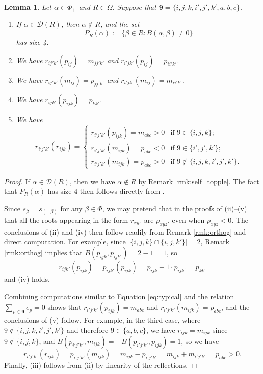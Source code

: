 \documentclass[10pt,a4paper]{amsart}
\newtheorem{lemma}[theorem]{Lemma}
\numberwithin{equation}{section}
\newcommand{\al}{\alpha}
\newcommand{\be}{\beta}
\newcommand{\res}{\mathscr{D}}
\newcommand{\nine}{\mathbf{9}}
\newcommand{\ob}{\Omega}
\newcommand{\pra}{P_R(\al)}
\newcommand{\abs}[1]{\lvert #1 \rvert}
\begin{document}
\begin{lemma}
\label{lem:res_prep}
Let $\al\in \Phi_+$ and $R\in \ob$.
Suppose that $\nine=\{i,j,k,i',j',k',a,b,c\}$.
\begin{enumerate}
\item If $\al\in \res(R)$, then $\al\notin R$, and the set
  \[
    \pra:=\{\beta\in R: B(\al,\beta)\neq 0\}
  \]
  has size 4.  
\item We have $r_{ij'k'}(p_{ij})=m_{jj'k'}$ and $r_{i'jk'}(p_{ij})=p_{ii'k'}$.
\item We have $r_{ij'k'}(m_{ij})=p_{jj'k'}$ and $r_{i'jk'}(m_{ij})=m_{ii'k'}$.
\item We have $r_{ijk'}(p_{ijk})=p_{kk'}$.
\item We have 
  \[
    r_{i'j'k'}(r_{ijk})= 
  \begin{cases} 
    r_{i'j'k'}(p_{ijk})=m_{abc}>0 & \text{if $9\in \{i,j,k\}$};\\
    r_{i'j'k'}(m_{ijk})=p_{abc}<0 & \text{if $9\in \{i',j',k'\}$};\\
    r_{i'j'k'}(m_{ijk})=p_{abc}>0 & \text{if $9\notin \{i,j,k,i',j',k'\}$}.
  \end{cases}
  \]
\end{enumerate}
\end{lemma}

\begin{proof}
  If $\al\in \res(R)$, then we have $\al\notin R$ by Remark
  \ref{rmk:self_topple}. The fact that $\pra$ has size 4 then follows directly
  from \cite[Proposition 2.1 (i)]{gx5}. 

  Since $s_\be=s_{(-\be)}$ for any $\be\in \Phi$, we may pretend that in the
  proofs of (ii)--(v) that all the roots appearing in the form $r_{xyz}$ are
  $p_{xyz}$, even when $p_{xyz}<0$. The conclusions of (ii) and (iv) then follow
  readily from Remark \ref{rmk:orthog} and direct computation. For example,
  since $\abs{\{i,j,k\}\cap\{i,j,k'\}}=2$, Remark \ref{rmk:orthog} implies that
  $B(p_{ijk},p_{ijk'})=2-1=1$, so 
  \begin{equation}
  \label{eq:typical}
    r_{ijk'}(p_{ijk})=p_{ijk'}(p_{ijk})=p_{ijk}-1\cdot p_{ijk'}=p_{kk'}
  \end{equation}
  and (iv) holds. 

  Combining computations similar to Equation \eqref{eq:typical} and the relation
  $\sum_{p\in \nine}e_p=0$ shows that $r_{i'j'k'}(p_{ijk})=m_{abc}$ and
  $r_{i'j'k'}(m_{ijk})=p_{abc}$, and the conclusions of (v) follow. For example,
  in the third case, where $9\notin \{i,j,k,i',j',k'\}$ and therefore $9\in
  \{a,b,c\}$, we have $r_{ijk}=m_{ijk}$ since $9\notin \{i,j,k\}$, and
  $B(p_{i'j'k'},m_{ijk})=-B(p_{i'j'k'},p_{ijk})=1$, so we have 
  \[
    r_{i'j'k'}(r_{ijk})=p_{i'j'k'}(m_{ijk})=m_{ijk}-p_{i'j'k'}=m_{ijk}+m_{i'j'k'}=p_{abc}>0.
  \]
  Finally, (iii) follows from (ii) by linearity of the reflections. 
\end{proof}
\end{document}
